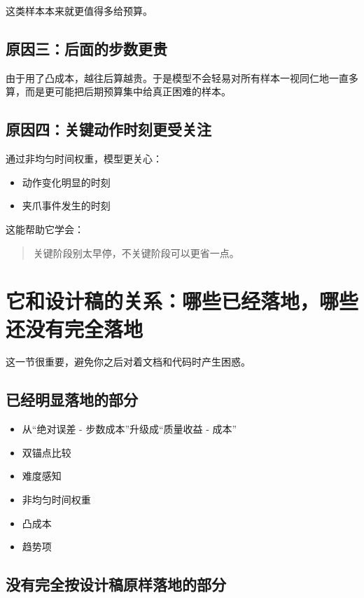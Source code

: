 \documentclass[12pt]{ctexart}
\begin{document}
这类样本本来就更值得多给预算。

\subsection{原因三：后面的步数更贵}

由于用了凸成本，越往后算越贵。于是模型不会轻易对所有样本一视同仁地一直多算，而是更可能把后期预算集中给真正困难的样本。

\subsection{原因四：关键动作时刻更受关注}

通过非均匀时间权重，模型更关心：

\begin{itemize}
    \item 动作变化明显的时刻
    \item 夹爪事件发生的时刻
\end{itemize}

这能帮助它学会：

\begin{quote}
    关键阶段别太早停，不关键阶段可以更省一点。
\end{quote}

\section{它和设计稿的关系：哪些已经落地，哪些还没有完全落地}

这一节很重要，避免你之后对着文档和代码时产生困惑。

\subsection{已经明显落地的部分}

\begin{itemize}
    \item 从“绝对误差 - 步数成本”升级成“质量收益 - 成本”
    \item 双锚点比较
    \item 难度感知
    \item 非均匀时间权重
    \item 凸成本
    \item 趋势项
\end{itemize}

\subsection{没有完全按设计稿原样落地的部分}
\end{document}
